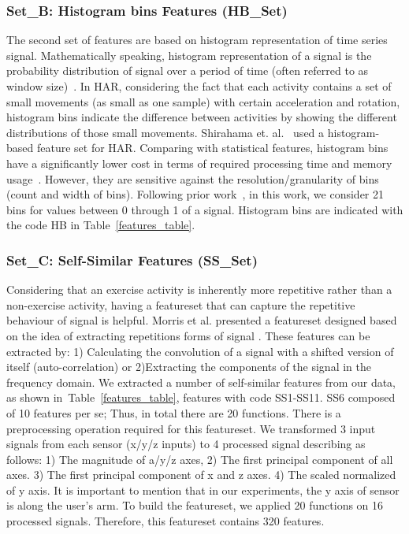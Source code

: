 \documentclass[journal,article,submit,moreauthors,pdftex]{Definitions/mdpi}
\begin{document}
\subsubsection{Set\_B: Histogram bins Features (HB\_Set)}
The second set of features are based on histogram representation of time series signal. Mathematically speaking, histogram representation of a signal is the probability distribution of signal over a period of time (often referred to as window size)~\cite{zardoshti1995emg}. In HAR, considering the fact that each activity contains a set of small movements (as small as one sample) with certain acceleration and rotation, histogram bins indicate the difference between activities by showing the different distributions of those small movements. Shirahama et. al.~\cite{shirahama2016codebook} used a histogram-based feature set for HAR. Comparing with statistical features, histogram bins have a significantly lower cost in terms of required processing time and memory usage~\cite{Sarbishei2019platform}. However, they are sensitive against the resolution/granularity of bins (count and width of bins). Following prior work~\cite{xi2017evaluation}, in this work, we consider 21 bins for values between 0 through 1 of a signal. Histogram bins are indicated with the code HB in Table~\ref{features_table}.

\subsubsection{Set\_C: Self-Similar Features (SS\_Set)}

Considering that an exercise activity is inherently more repetitive rather than a non-exercise activity, having a featureset that can capture the repetitive behaviour of signal is helpful. Morris et al. presented a featureset designed based on the idea of extracting repetitions forms of signal \cite{morris2014recofit}. These features can be extracted by: 1) Calculating the convolution of a signal with a shifted version of itself (auto-correlation) or 2)Extracting the components of the signal in the frequency domain. We extracted a number of self-similar features from our data, as shown in~Table~\ref{features_table}, features with code SS1-SS11. SS6 composed of 10 features per se; Thus, in total there are 20 functions.
There is a preprocessing operation required for this featureset. We transformed 3 input signals from each sensor (x/y/z inputs) to 4 processed signal describing as follows: 1) The magnitude of a/y/z axes, 2) The first principal component of all axes. 3) The first principal component of x and z axes. 4) The scaled normalized of y axis. It is important to mention that in our experiments, the y axis of sensor is along the user's arm. To build the featureset, we applied 20 functions on 16 processed signals. Therefore, this featureset contains 320 features.
\end{document}
